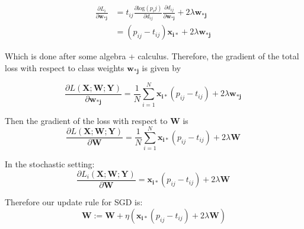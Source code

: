 \documentclass[a4paper,12pt]{article}
\begin{document}
$$
\begin{aligned} 
\frac{\partial L_i}{\partial \mathbf{w_{*j}}} &= 
t_{ij} \frac{ \partial \textrm{log}(p_ij) }{\partial d_{ij}}
\frac{\partial d_{ij}}{\partial \mathbf{w_{*j} } } + 2\lambda \mathbf{w_{*j} }\\
&= (p_{ij} - t_{ij}) \mathbf{x_{i*} } + 2\lambda \mathbf{w_{*j} }\
\end{aligned}
$$

Which is done after some algebra + calculus. Therefore, the gradient of the total loss with respect to class weights $\mathbf{w_{*j}}$ is given by

$$
\frac{\partial L(\mathbf{X;W;Y})}{\partial \mathbf{w_{*j}}} = \frac{1}{N} \sum_{i=1}^N \mathbf{x_{i*}}(p_{ij} - t_{ij}) + 2\lambda \mathbf{w_{*j} }\
$$

Then the gradient of the loss with respect to $\mathbf{W}$ is 
$$
\frac{\partial L(\mathbf{X;W;Y})}{\partial \mathbf{W}} = \frac{1}{N} \sum_{i=1}^N \mathbf{x_{i*}}(p_{ij} - t_{ij}) + 2\lambda \mathbf{W }\
$$

In the stochastic setting: 
$$
\frac{\partial L_i(\mathbf{X;W;Y})}{\partial \mathbf{W}} = \mathbf{x_{i*}}(p_{ij} - t_{ij}) + 2\lambda \mathbf{W }\
$$

Therefore our update rule for SGD is: 
$$
\mathbf{W} := \mathbf{W} + \eta( \mathbf{x_{i*}}(p_{ij} - t_{ij}) + 2\lambda \mathbf{W} ) 
$$
\end{document}

